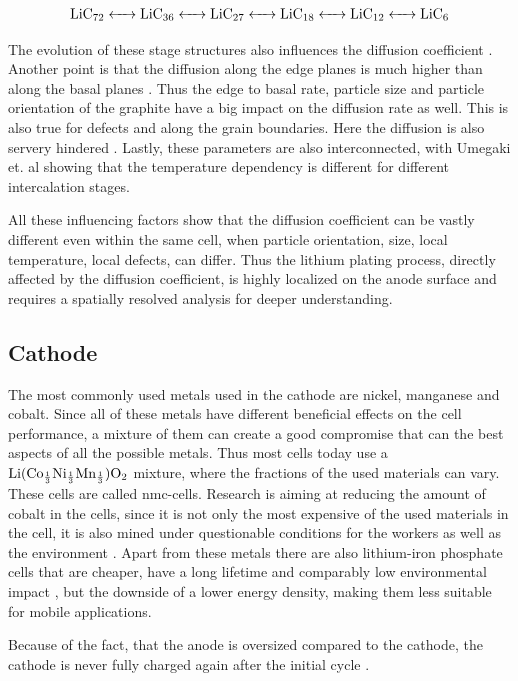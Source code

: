 \begin{align}
    \ce{LiC72 <-> LiC36 <-> LiC27 <-> LiC18 <-> LiC12 <-> LiC6} 
\end{align}



The evolution of these stage structures also influences the diffusion coefficient \cite{Li.2019}. Another point is that the diffusion along the edge planes is much higher than along the basal planes \cite{Persson.2010}. Thus the edge to basal rate, particle size and particle orientation of the graphite have a big impact on the diffusion rate as well. This is also true for defects and along the grain boundaries. Here the diffusion is also servery hindered \cite{Persson.2010}. Lastly, these parameters are also interconnected, with Umegaki et. al \cite{Umegaki.2017} showing that the temperature dependency is different for different intercalation stages. \par
All these influencing factors show that the diffusion coefficient can be vastly different even within the same cell, when particle orientation, size, local temperature, local defects, can differ. Thus the lithium plating process, directly affected by the diffusion coefficient, is highly localized on the anode surface and requires a spatially resolved analysis for deeper understanding.

\subsection{Cathode}
 The most commonly used metals used in the cathode are nickel, manganese and cobalt. Since all of these metals have different beneficial effects on the cell performance, a mixture of them can create a good compromise that can the best aspects of all the possible metals. Thus most cells today use a $\ce{Li(Co_{\frac{1}{3}}Ni_{\frac{1}{3}}Mn_{\frac{1}{3}})O2}$ mixture, where the fractions of the used materials can vary. These cells are called \gls{nmc}-cells. Research is aiming at reducing the amount of cobalt in the cells, since it is not only the most expensive of the used materials in the cell, it is also mined under questionable conditions for the workers as well as the environment \cite{Zubi.2018}. Apart from these metals there are also lithium-iron phosphate cells that are cheaper, have a long lifetime and comparably low environmental impact \cite{Deng.2015}, but the downside of a lower energy density, making them less suitable for mobile applications.\par
 Because of the fact, that the anode is oversized compared to the cathode, the cathode is never fully charged again after the initial cycle \cite{Palacin.2018}.
 
